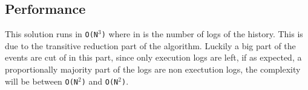 \subsection{Performance} %
This solution runs in \texttt{O(N$^3$)} where in is the number of logs of the history. This is due to the transitive reduction part of the algorithm. Luckily a big part of the events are cut of in this part, since only execution logs are left, if as expected, a proportionally majority part of the logs are non exectution logs, the complexity will be between \texttt{O(N$^2$)} and \texttt{O(N$^2$)}.

